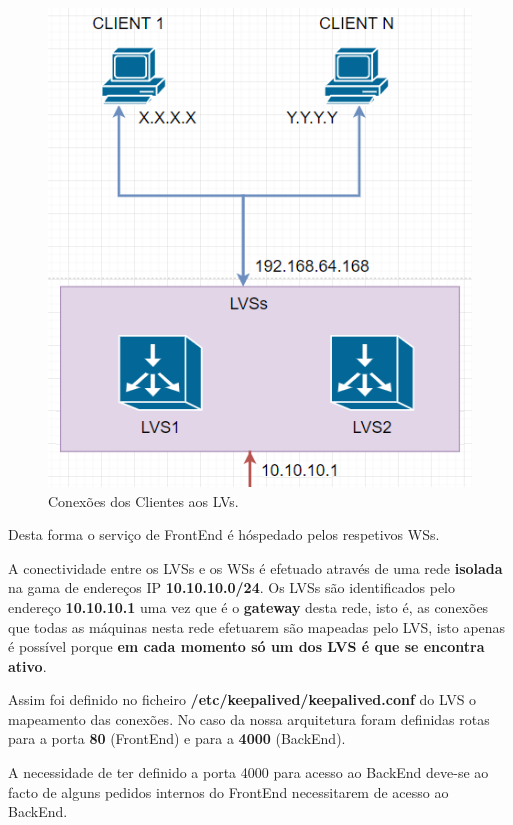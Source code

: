 \begin{figure}[H]
	\centering
	\includegraphics[scale=0.45]{imagens/client-lvs.PNG}
	\caption{Conexões dos Clientes aos LVs.}
	\label{img:pag}
\end{figure}

\hspace{5mm} Desta forma o serviço de FrontEnd é hóspedado pelos respetivos WSs.

\hspace{5mm} A conectividade entre os LVSs e os WSs é efetuado através de uma rede \textbf{isolada} na gama de endereços IP \textbf{10.10.10.0/24}. Os LVSs são identificados pelo endereço \textbf{10.10.10.1} uma vez que é o \textbf{gateway} desta rede, isto é, as conexões que todas as máquinas nesta rede efetuarem são mapeadas pelo LVS, isto apenas é possível porque \textbf{em cada momento só um dos LVS é que se encontra ativo}.

\hspace{5mm} Assim foi definido no ficheiro \textbf{
/etc/keepalived/keepalived.conf} do LVS o mapeamento das conexões. No caso da nossa arquitetura foram definidas rotas para a porta \textbf{80} (FrontEnd) e para a \textbf{4000} (BackEnd).

\hspace{5mm} A necessidade de ter definido a porta 4000 para acesso ao BackEnd deve-se ao facto de alguns pedidos internos do FrontEnd necessitarem de acesso ao BackEnd. 

